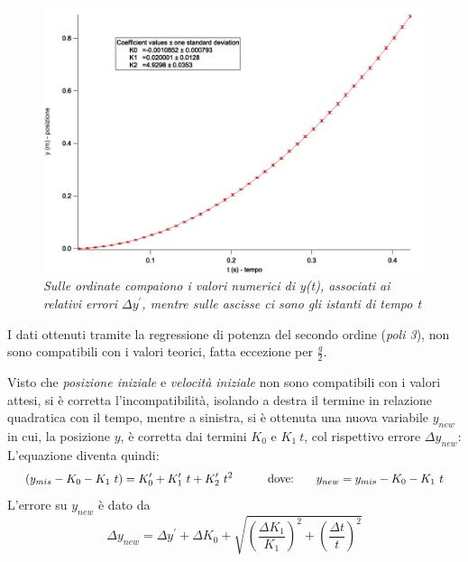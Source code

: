 \documentclass[12pt, a4paper]{article}
\begin{document}
    \begin{figure}[h!]
\centering
\includegraphics[width=170mm]{Immagini/Graph4 non comp.jpg}
\caption{\textit{{\footnotesize{Sulle ordinate compaiono i valori numerici di \textit{y(t)}, associati ai relativi errori  \textit{$\Delta y^{'}$}, mentre sulle ascisse ci sono gli istanti di tempo \textit{t}}}}}
\label{Grafico parabolico}
\end{figure}

I dati ottenuti tramite la regressione di potenza del secondo ordine (\textit{poli 3}), non sono compatibili con i valori teorici, fatta eccezione per $\displaystyle{\frac{g}{2}}$.

    \bigskip
Visto che \textit{posizione iniziale} e \textit{velocità iniziale} non sono compatibili con i valori attesi, si è corretta l'incompatibilità, isolando a destra il termine in relazione  quadratica con il tempo, mentre a sinistra, si è ottenuta una nuova variabile $y_{new}$ in cui, la posizione $y$, è corretta dai termini $K_0$ e $ K_1\ t$, col rispettivo errore $\Delta y_{new}$: \\
L'equazione diventa quindi:
\begin{equation*}
\begin{aligned}
  & & (y_{mis} - K_0 - K_1\ t) = K_0'+K_1'\ t+K_{2}'\ t^2
  &\quad{} 
  \end{aligned}
  \begin{aligned}
  & &\text{dove:\phantom{.......}} y_{new} = y_{mis} - K_0 - K_1\ t 
  &
  \end{aligned}
\end{equation*}
L'errore su  $y_{new}$ è dato da
\begin{equation*}
 \Delta y_{new} = \Delta y^{'} + \Delta K_0 + \sqrt{\left(\frac{\Delta K_1}{K_1}\right)^2 + \left(\frac{\Delta t}{t}\right)^2}
 \end{equation*}
\end{document}
